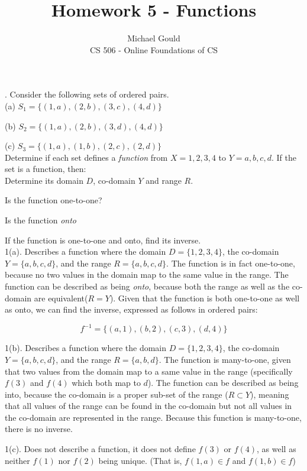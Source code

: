 \documentclass[10pt]{article}
\begin{document}
\title{Homework 5 - Functions}
\author{Michael Gould\\ 
CS 506 - Online Foundations of CS}

. Consider the following sets of ordered pairs.\\

(a) $S_1 = \{(1,a),(2,b),(3,c),(4,d)\}$

(b) $S_2 = \{(1,a),(2,b),(3,d),(4,d)\}$

(c) $S_3 = \{(1,a),(1,b),(2,c),(2,d)\}$\\

Determine if each set defines a \textit{function} from $X = {1,2,3,4}$ to $Y = {a,b,c,d}$.  If the set is a function, then:\\

Determine its domain $D$, co-domain $Y$ and range $R$.

Is the function one-to-one?

Is the function \textit{onto}

If the function is one-to-one and onto, find its inverse.\\

1(a).  Describes a function where the domain $D = \{1,2,3,4\}$, the co-domain $Y = \{a,b,c,d\}$, and the range $R = \{a,b,c,d\}$.  The function is in fact one-to-one, because no two values in the domain map to the same value in the range.  The function can be described as being \textit{onto}, because both the range as well as the co-domain are equivalent($R = Y$).  Given that the function is both one-to-one as well as onto, we can find the inverse, expressed as follows in ordered pairs:

$$f^{-1} = \{(a,1),(b,2),(c,3),(d,4)\}$$

1(b).  Describes a function where the domain $D = \{1,2,3,4\}$, the co-domain $Y = \{a,b,c,d\}$, and the range $R = \{a,b,d\}$.  The function is many-to-one, given that two values from the domain map to a same value in the range (specifically $f(3)$ and $f(4)$ which both map to $d$).  The function can be described as being into, because the co-domain is a proper sub-set of the range ($R \subset Y$), meaning that all values of the range can be found in the co-domain but not all values in the co-domain are represented in the range.  Because this function is many-to-one, there is no inverse.

1(c). Does not describe a function, it does not define $f(3)$ or $f(4)$, as well as neither $f(1)$ nor $f(2)$ being unique. (That is, $f(1,a) \in f$ and $f(1,b) \in f$)
\end{document}
